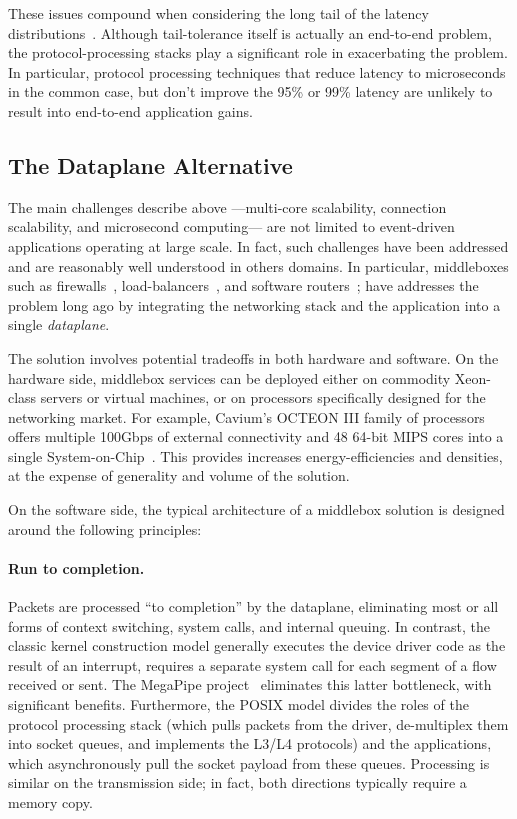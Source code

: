 These issues compound when considering the long tail of the latency
distributions~\cite{DBLP:journals/cacm/DeanB13}. Although
tail-tolerance itself is actually an end-to-end problem, the
protocol-processing stacks play a significant role in exacerbating the
problem.  In particular, protocol processing techniques that reduce
latency to microseconds in the common case, but don't improve the 95\%
or 99\% latency are unlikely to result into end-to-end application
gains.

\subsection{The Dataplane Alternative}
\label{sec:motivation:dp}

The main challenges describe above ---multi-core scalability,
connection scalability, and microsecond computing--- are not limited
to event-driven applications operating at large scale.  In fact, such
challenges have been addressed and are reasonably well understood in
others domains.  In particular, middleboxes such as
firewalls~\cite{missing}, load-balancers~\cite{missing}, and software
routers~\cite{DBLP:journals/tocs/KohlerMCJK00,DBLP:conf/sosp/DobrescuEACFIKMR09};
have addresses the problem long ago by integrating the networking
stack and the application into a single \emph{dataplane}.

The solution involves potential tradeoffs in both hardware and
software.  On the hardware side, middlebox services can be deployed
either on commodity Xeon-class servers or virtual machines, or on
processors specifically designed for the networking market.  For
example, Cavium's OCTEON III family of processors offers multiple
100Gbps of external connectivity and 48 64-bit MIPS cores into a
single System-on-Chip~\cite{cavium-octeon}.  This provides increases
energy-efficiencies and densities, at the expense of generality and
volume of the solution.  

On the software side, the typical architecture of a middlebox solution
is designed around the following principles: 

\paragraph{Run to completion.}  Packets are processed ``to
completion'' by the dataplane, eliminating most or all forms of
context switching, system calls, and internal queuing.  In contrast,
the classic kernel construction model generally executes the device
driver code as the result of an interrupt, requires a separate system
call for each segment of a flow received or sent.  The MegaPipe
project~\cite{han2012megapipe} eliminates this latter bottleneck, with
significant benefits.  Furthermore, the POSIX model divides the roles
of the protocol processing stack (which pulls packets from the driver,
de-multiplex them into socket queues, and implements the L3/L4
protocols) and the applications, which asynchronously pull the socket
payload from these queues.  Processing is similar on the transmission
side; in fact, both directions typically require a memory copy.

